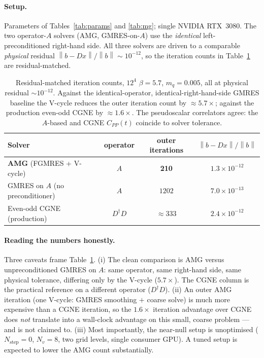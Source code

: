 \documentclass[12pt,a4paper]{article}
\newcommand{\Ddw}{D}
\newcommand{\Aop}{A}
\newcommand{\dg}{^{\dagger}}
\newcommand{\norm}[1]{\left\lVert #1 \right\rVert}
\begin{document}
\paragraph{Setup.} Parameters of Tables~\ref{tab:params} and \ref{tab:mg}; single
NVIDIA RTX~3080. The two operator-$\Aop$ solvers (AMG, GMRES-on-$\Aop$) use the
\emph{identical} left-preconditioned right-hand side. All three solvers are driven
to a comparable \emph{physical} residual $\norm{b-\Ddw x}/\norm{b}\sim10^{-12}$,
so the iteration counts in Table~\ref{tab:results} are residual-matched.

\begin{table}[h]
\centering
\begin{tabular}{lccc}
\toprule
Solver & operator & outer iterations & $\norm{b-\Ddw x}/\norm{b}$ \\
\midrule
\textbf{AMG} (FGMRES + V-cycle) & $\Aop$ & \textbf{210} & $1.3\times10^{-12}$ \\
GMRES on $\Aop$ (no preconditioner) & $\Aop$ & $1202$ & $7.0\times10^{-13}$ \\
Even-odd CGNE (production) & $\Ddw\dg\Ddw$ & $\approx 333$ & $2.4\times10^{-12}$ \\
\bottomrule
\end{tabular}
\caption{Residual-matched iteration counts, $12^4$ $\beta=5.7$, $m_q=0.005$, all
at physical residual $\sim10^{-12}$. Against the identical-operator,
identical-right-hand-side GMRES baseline the V-cycle reduces the outer iteration
count by $\approx5.7\times$; against the production even-odd CGNE by
$\approx1.6\times$. The pseudoscalar correlators agree: the $\Aop$-based and CGNE
$C_{PP}(t)$ coincide to solver tolerance.}
\label{tab:results}
\end{table}

\paragraph{Reading the numbers honestly.}
Three caveats frame Table~\ref{tab:results}.
(i) The clean comparison is AMG versus unpreconditioned GMRES on $\Aop$: same
operator, same right-hand side, same physical tolerance, differing only by the
V-cycle ($5.7\times$). The CGNE column is the practical reference on a different
operator ($\Ddw\dg\Ddw$).
(ii) An outer AMG iteration (one V-cycle: GMRES smoothing $+$ coarse solve) is much
more expensive than a CGNE iteration, so the $1.6\times$ iteration advantage over
CGNE does \emph{not} translate into a wall-clock advantage on this small, coarse
problem --- and is not claimed to.
(iii) Most importantly, the near-null setup is unoptimised ($N_{\mathrm{step}}=0$,
$N_v=8$, two grid levels, single consumer GPU). A tuned setup is expected to
lower the AMG count substantially.
\end{document}
